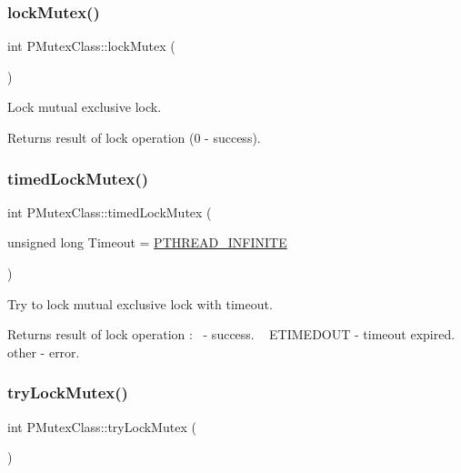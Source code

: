 \subsubsection{\texorpdfstring{lock\+Mutex()}{lockMutex()}}
{\footnotesize\ttfamily int P\+Mutex\+Class\+::lock\+Mutex (\begin{DoxyParamCaption}{ }\end{DoxyParamCaption})\hspace{0.3cm}{\ttfamily [inline]}}

Lock mutual exclusive lock. \begin{DoxyReturn}{Returns}
result of lock operation (0 -\/ success). 
\end{DoxyReturn}
\mbox{\label{classPMutexClass_a18cc2519c5f1d0ee601af43cd400aa67}} 
\subsubsection{\texorpdfstring{timed\+Lock\+Mutex()}{timedLockMutex()}}
{\footnotesize\ttfamily int P\+Mutex\+Class\+::timed\+Lock\+Mutex (\begin{DoxyParamCaption}\item[{unsigned long}]{Timeout = {\ttfamily \hyperlink{PThreadClassLib_8h_a9d2d74d73cb5d069fbfcbcfebf42bd6e}{P\+T\+H\+R\+E\+A\+D\+\_\+\+I\+N\+F\+I\+N\+I\+TE}} }\end{DoxyParamCaption})}

Try to lock mutual exclusive lock with timeout. \begin{DoxyReturn}{Returns}
result of lock operation \+:~ -\/ success. ~\newline
 E\+T\+I\+M\+E\+D\+O\+UT -\/ timeout expired.~\newline
 other -\/ error. 
\end{DoxyReturn}
\mbox{\label{classPMutexClass_a21eab0587c0a3b769f952b5a61db8c10}} 
\subsubsection{\texorpdfstring{try\+Lock\+Mutex()}{tryLockMutex()}}
{\footnotesize\ttfamily int P\+Mutex\+Class\+::try\+Lock\+Mutex (\begin{DoxyParamCaption}{ }\end{DoxyParamCaption})\hspace{0.3cm}{\ttfamily [inline]}}

